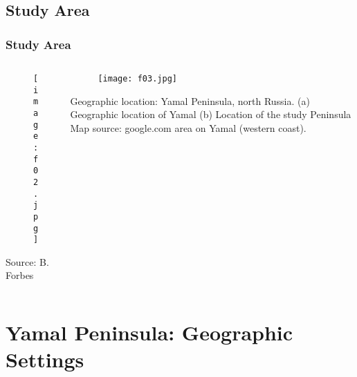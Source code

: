 \documentclass[pdflatex,compress,8pt,
	xcolor={dvipsnames,dvipsnames,svgnames,x11names,table},
	hyperref={colorlinks = true,breaklinks = true, urlcolor = NavyBlue, breaklinks = true}]{beamer}
\begin{document}
\subsection{Study Area}
\begin{frame}\frametitle{Study Area}
\begin{minipage}[0.4\textheight]{\textwidth}
\begin{columns}[T]
\begin{column}{0.5\textwidth}
\vspace{2em}
\begin{figure}[H]
	\centering
		\texttt{[image: f02.jpg]}
\end{figure}
Source: B. Forbes
\end{column}
\begin{column}{0.5\textwidth}
\vspace{2em}
\begin{figure}[H]
	\centering
		\texttt{[image: f03.jpg]}
\end{figure}
Geographic location: Yamal Peninsula, north Russia.
(a) Geographic location of Yamal
(b) Location of the study Peninsula Map source: google.com area on Yamal (western coast). 
\end{column}
\end{columns}
\end{minipage}
\end{frame}

\section{Yamal Peninsula: Geographic Settings}
\end{document}
